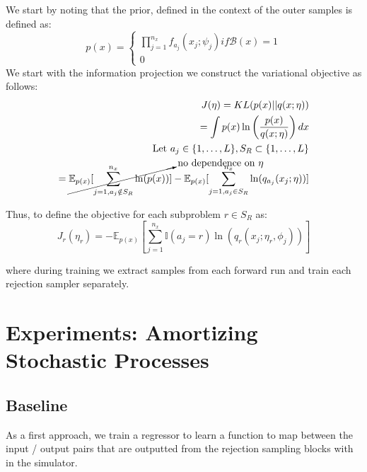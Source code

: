 \documentclass{article}
\begin{document}
We start by noting that the prior, defined in the context of the outer samples is 
defined as: 
\begin{equation}
  p(x) = 
  \begin{cases}
    \prod^{n_{x}}_{j=1} f_{a_j}(x_j ; \psi_j) if \mathcal{B}(x) = 1 \\
    0
  \end{cases}
\end{equation}
We start with the information projection we construct the variational objective as follows:
\begin{align*}
  J(\eta) = KL(p(x) || q(x; \eta)) \\
   = \int p(x)\ln\left(\frac{p(x)}{q(x;\eta)}\right) dx \\
   \text{Let } a_{j} \in \{1, \ldots, L\} , S_{R} \subset \{1, \ldots, L\} \\
   = \cancelto{\text{no dependence on } \eta}{\mathbb{E}_{p(x)}[\sum^{n_x}_{j=1,a_j \notin S_{R}}\ln(p(x))]}-\mathbb{E}_{p(x)}[\sum^{n_x}_{j=1,a_j \in S_{R}}\ln(q_{a_j}(x_j;\eta))]\\
\end{align*}

Thus, to define the objective for each subproblem $r  \in S_{R}$ as:
\begin{equation}
  J_{r}(\eta_r) = -\mathbb{E}_{p(x)}[\sum^{n_x}_{j=1}\mathbb{I}(a_j = r)\ln(q_r(x_j;\eta_r, \phi_j))]
\end{equation}

where during training we extract samples from each forward run and train each rejection sampler
separately. 


\section{Experiments: Amortizing Stochastic Processes}

\subsection{Baseline}
As a first approach, we train a regressor to learn a function to map
between the input / output pairs that are outputted from the rejection
sampling blocks with in the simulator. 
\end{document}
